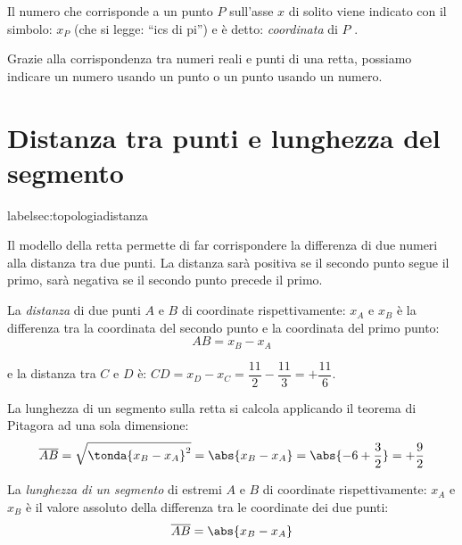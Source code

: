 \vspace{.5em}
Il numero che corrisponde a un punto \(P\) sull'asse \(x\) 
di solito viene indicato con il simbolo: \(x_P\) (che si legge: 
``ics di pi'') e è detto: \emph{coordinata} di \(P\) .

Grazie alla corrispondenza tra numeri reali e punti di una retta, 
possiamo indicare un numero usando un punto o un punto usando un numero.

\section{Distanza tra punti e lunghezza del segmento}
label{sec:topologiadistanza}

Il modello della retta permette di far corrispondere la differenza di due 
numeri alla distanza tra due punti. 
La distanza sarà positiva se il secondo punto segue il primo, sarà negativa 
se il secondo punto precede il primo.

\begin{newdef}{}{}
La \emph{distanza} di due punti \(A\) e \(B\) di coordinate 
rispettivamente:
\(x_A\) e \(x_B\) è la differenza tra la coordinata del secondo punto e la 
coordinata del primo punto: 
\[AB = x_B -x_A\]
\end{newdef}

\vspace{.5em}

\noindent e la distanza tra \(C\) e \(D\) è: \quad
\(CD = x_D - x_C = \dfrac{11}{2} - \dfrac{11}{3} = +\dfrac{11}{6}\).

La lunghezza di un segmento sulla retta si calcola applicando il teorema di 
Pitagora ad una sola dimensione:
\[\overline{AB} = \sqrt{\tonda{x_B - x_A}^2} = \abs{x_B - x_A}=
  \abs{-6 + \dfrac{3}{2}} = +\dfrac{9}{2}\]

\begin{newdef}{}{}
La \emph{lunghezza di un segmento} di estremi \(A\) e \(B\) di coordinate 
rispettivamente:
\(x_A\) e \(x_B\) è il valore assoluto della differenza tra le coordinate 
dei due punti: 
\[\overline{AB} = \abs{x_B -x_A}\]
\end{newdef}

\newcommand{\lung}[2]{\mathcal{L}\punto{#1}{#2}}

